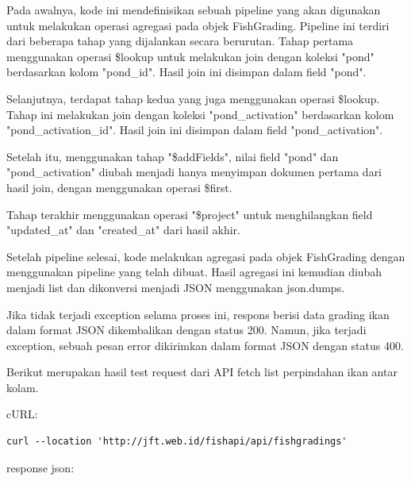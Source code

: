\begin{enumerate}[1.]
Pada awalnya, kode ini mendefinisikan sebuah pipeline yang akan digunakan untuk melakukan operasi agregasi pada objek FishGrading. Pipeline ini terdiri dari beberapa tahap yang dijalankan secara berurutan. Tahap pertama menggunakan operasi \$lookup untuk melakukan join dengan koleksi "pond" berdasarkan kolom "pond\_id". Hasil join ini disimpan dalam field "pond".

Selanjutnya, terdapat tahap kedua yang juga menggunakan operasi \$lookup. Tahap ini melakukan join dengan koleksi "pond\_activation" berdasarkan kolom "pond\_activation\_id". Hasil join ini disimpan dalam field "pond\_activation".

Setelah itu, menggunakan tahap "\$addFields", nilai field "pond" dan "pond\_activation" diubah menjadi hanya menyimpan dokumen pertama dari hasil join, dengan menggunakan operasi \$first.

Tahap terakhir menggunakan operasi "\$project" untuk menghilangkan field "updated\_at" dan "created\_at" dari hasil akhir.

Setelah pipeline selesai, kode melakukan agregasi pada objek FishGrading dengan menggunakan pipeline yang telah dibuat. Hasil agregasi ini kemudian diubah menjadi list dan dikonversi menjadi JSON menggunakan json.dumps.

Jika tidak terjadi exception selama proses ini, respons berisi data grading ikan dalam format JSON dikembalikan dengan status 200. Namun, jika terjadi exception, sebuah pesan error dikirimkan dalam format JSON dengan status 400.

Berikut merupakan hasil test request dari API fetch list perpindahan ikan antar kolam.

cURL:

\begin{lstlisting}
curl --location 'http://jft.web.id/fishapi/api/fishgradings'
\end{lstlisting}

response json:


\end{enumerate}
